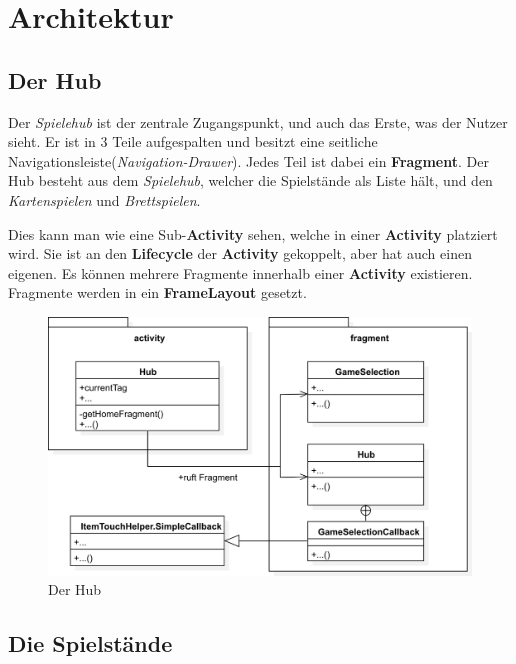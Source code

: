 \chapter{Architektur}

\section{Der Hub}
\sectionauthor{\leonard}

Der \emph{Spielehub} ist der zentrale Zugangspunkt, und auch das Erste, was der
Nutzer sieht. Er ist in 3 Teile aufgespalten und besitzt eine seitliche
Navigationsleiste(\emph{Navigation-Drawer}). Jedes Teil ist dabei ein
\textbf{Fragment}. Der Hub besteht aus dem \emph{Spielehub}, welcher die
Spielstände als Liste hält, und den \emph{Kartenspielen} und \emph{Brettspielen}.

\begin{infobox}[frametitle=Fragment]
Dies kann man wie eine Sub-\textbf{Activity} sehen, welche in einer
\textbf{Activity} platziert wird. Sie ist an den \textbf{Lifecycle} der
\textbf{Activity} gekoppelt, aber hat auch einen eigenen. Es können
mehrere Fragmente innerhalb einer \textbf{Activity} existieren. Fragmente werden
in ein \textbf{FrameLayout} gesetzt.
\end{infobox}

\begin{figure}[h]
	\centering
	\includegraphics[width=1.0\textwidth]{resources/hub/Hub}
	\caption{Der Hub}
\end{figure}

\section{Die Spielstände}
\sectionauthor{\leonard}

